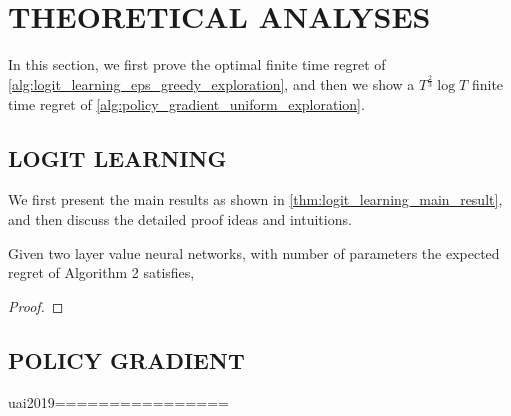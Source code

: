\section{THEORETICAL ANALYSES}
\label{sec:theoretical_analyses}

In this section, we first prove the optimal finite time regret of \cref{alg:logit_learning_eps_greedy_exploration}, and then we show a $T^{\frac{2}{3}}\log{T}$ finite time regret of \cref{alg:policy_gradient_uniform_exploration}.

\subsection{LOGIT LEARNING}
\label{subsec:theoretical_analyses_logit_learning}

We first present the main results as shown in \cref{thm:logit_learning_main_result}, and then discuss the detailed proof ideas and intuitions.

\begin{thm}
\label{thm:logit_learning_main_result}
    Given two layer value neural networks, with number of parameters the expected regret of Algorithm 2 satisfies,
\end{thm}
\begin{proof}
    
\end{proof}


\subsection{POLICY GRADIENT}
\label{subsec:theoretical_analyses_policy_gradient}

uai2019================



